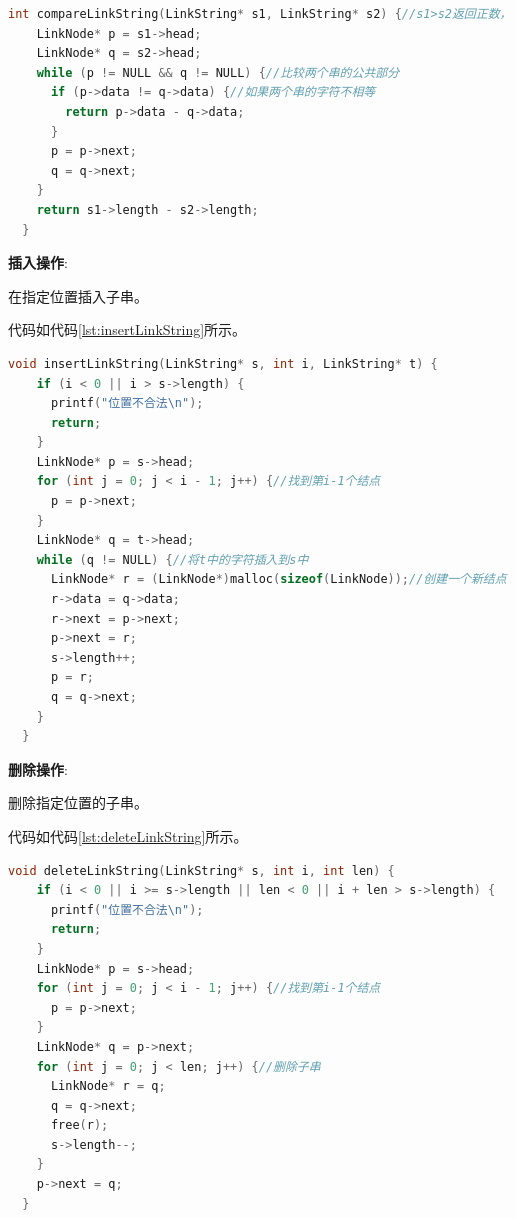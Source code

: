 \documentclass[lang=cn,newtx,10pt,scheme=chinese]{elegantbook}
\begin{document}
\begin{lstlisting}[language=C++, caption={比较两个串的大小示例代码}, label={lst:compareLinkString}]
  int compareLinkString(LinkString* s1, LinkString* s2) {//s1>s2返回正数，s1=s2返回0，s1<s2返回负数
    LinkNode* p = s1->head;
    LinkNode* q = s2->head;
    while (p != NULL && q != NULL) {//比较两个串的公共部分
      if (p->data != q->data) {//如果两个串的字符不相等
        return p->data - q->data;
      }
      p = p->next;
      q = q->next;
    }
    return s1->length - s2->length;
  }

\end{lstlisting}

\textbf{插入操作}:

在指定位置插入子串。

代码如代码\ref{lst:insertLinkString}所示。

\begin{lstlisting}[language=C++, caption={在指定位置插入子串示例代码}, label={lst:insertLinkString}]
  void insertLinkString(LinkString* s, int i, LinkString* t) {
    if (i < 0 || i > s->length) {
      printf("位置不合法\n");
      return;
    }
    LinkNode* p = s->head;
    for (int j = 0; j < i - 1; j++) {//找到第i-1个结点
      p = p->next;
    }
    LinkNode* q = t->head;
    while (q != NULL) {//将t中的字符插入到s中
      LinkNode* r = (LinkNode*)malloc(sizeof(LinkNode));//创建一个新结点
      r->data = q->data;
      r->next = p->next;
      p->next = r;
      s->length++;
      p = r;
      q = q->next;
    }
  }

\end{lstlisting}

\textbf{删除操作}:

删除指定位置的子串。

代码如代码\ref{lst:deleteLinkString}所示。

\begin{lstlisting}[language=C++, caption={删除指定位置的子串示例代码}, label={lst:deleteLinkString}]
  void deleteLinkString(LinkString* s, int i, int len) {
    if (i < 0 || i >= s->length || len < 0 || i + len > s->length) {
      printf("位置不合法\n");
      return;
    }
    LinkNode* p = s->head;
    for (int j = 0; j < i - 1; j++) {//找到第i-1个结点
      p = p->next;
    }
    LinkNode* q = p->next;
    for (int j = 0; j < len; j++) {//删除子串
      LinkNode* r = q;
      q = q->next;
      free(r);
      s->length--;
    }
    p->next = q;
  }

\end{lstlisting}
\end{document}
